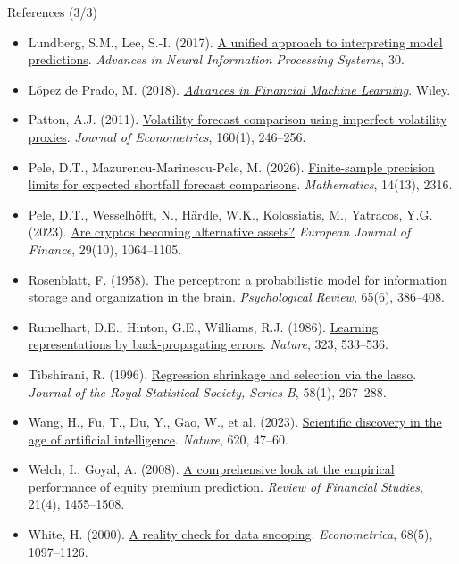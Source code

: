 \begin{frame}{References (3/3)}
\itemsize{\tiny}
\begin{itemize}
    \item Lundberg, S.M., Lee, S.-I. (2017). \href{https://proceedings.neurips.cc/paper/2017/hash/8a20a8621978632d76c43dfd28b67767-Abstract.html}{A unified approach to interpreting model predictions}. \textit{Advances in Neural Information Processing Systems}, 30.
    \item López de Prado, M. (2018). \href{https://www.wiley.com/en-us/Advances+in+Financial+Machine+Learning-p-9781119482086}{\textit{Advances in Financial Machine Learning}}. Wiley.
    \item Patton, A.J. (2011). \href{https://doi.org/10.1016/j.jeconom.2010.03.034}{Volatility forecast comparison using imperfect volatility proxies}. \textit{Journal of Econometrics}, 160(1), 246--256.
    \item Pele, D.T., Mazurencu-Marinescu-Pele, M. (2026). \href{https://doi.org/10.3390/math14132316}{Finite-sample precision limits for expected shortfall forecast comparisons}. \textit{Mathematics}, 14(13), 2316.
    \item Pele, D.T., Wesselhöfft, N., Härdle, W.K., Kolossiatis, M., Yatracos, Y.G. (2023). \href{https://doi.org/10.1080/1351847X.2021.1960403}{Are cryptos becoming alternative assets?} \textit{European Journal of Finance}, 29(10), 1064--1105.
    \item Rosenblatt, F. (1958). \href{https://doi.org/10.1037/h0042519}{The perceptron: a probabilistic model for information storage and organization in the brain}. \textit{Psychological Review}, 65(6), 386--408.
    \item Rumelhart, D.E., Hinton, G.E., Williams, R.J. (1986). \href{https://doi.org/10.1038/323533a0}{Learning representations by back-propagating errors}. \textit{Nature}, 323, 533--536.
    \item Tibshirani, R. (1996). \href{https://doi.org/10.1111/j.2517-6161.1996.tb02080.x}{Regression shrinkage and selection via the lasso}. \textit{Journal of the Royal Statistical Society, Series B}, 58(1), 267--288.
    \item Wang, H., Fu, T., Du, Y., Gao, W., et al. (2023). \href{https://doi.org/10.1038/s41586-023-06221-2}{Scientific discovery in the age of artificial intelligence}. \textit{Nature}, 620, 47--60.
    \item Welch, I., Goyal, A. (2008). \href{https://doi.org/10.1093/rfs/hhm014}{A comprehensive look at the empirical performance of equity premium prediction}. \textit{Review of Financial Studies}, 21(4), 1455--1508.
    \item White, H. (2000). \href{https://doi.org/10.1111/1468-0262.00152}{A reality check for data snooping}. \textit{Econometrica}, 68(5), 1097--1126.
\end{itemize}
\end{frame}


